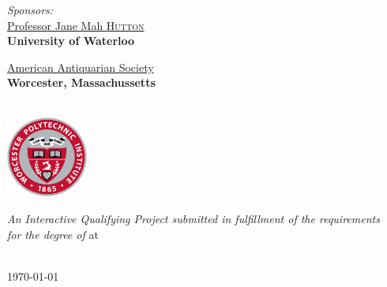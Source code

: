 \documentclass[
11pt, %
english, %
singlespacing, %
headsepline, %
]{MastersDoctoralThesis} %
\begin{document}
\begin{titlepage}
\begin{center}
\begin{minipage}[t]{0.4\textwidth}
\begin{flushright}
\emph{Sponsors:} \\
\href{https://uwaterloo.ca/architecture/profile/j2hutton}{Professor Jane Mah \textsc{Hutton}}\\
{\small \bfseries University of Waterloo}\vspace{0.4cm}

\href{https://www.americanantiquarian.org/}{American Antiquarian Society}\\
{\small \bfseries Worcester, Massachussetts}

\end{flushright}
\end{minipage}\\[1.5cm]

\includegraphics[width=0.2\textwidth]{Images/university.png}

\vfill

\large \textit{An Interactive Qualifying Project submitted in fulfillment of the requirements\\ for the degree of \degreename} at\\[0.3cm] %
\groupname \\[2cm] %
 
\vfill

{\large \monthyeardate\today}\\[4cm] %
 
\vfill
\end{center}
\end{titlepage}

\end{document}
